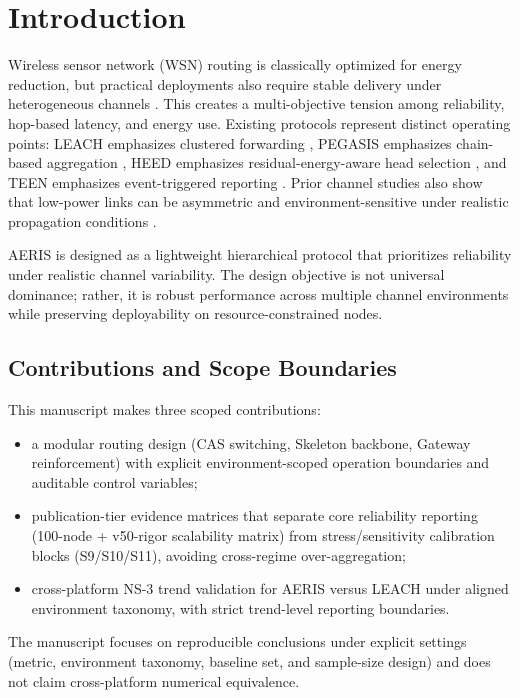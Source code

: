 ﻿\documentclass[sensors,article,submit,moreauthors,pdftex]{Definitions/mdpi}
\begin{document}
\section{Introduction}
Wireless sensor network (WSN) routing is classically optimized for energy reduction, but practical deployments also require stable delivery under heterogeneous channels \cite{Akyildiz2002Survey,Rault2016Energy,Kandris2020}. This creates a multi-objective tension among reliability, hop-based latency, and energy use. Existing protocols represent distinct operating points: LEACH emphasizes clustered forwarding \cite{Heinzelman2000LEACH}, PEGASIS emphasizes chain-based aggregation \cite{Lindsey2002PEGASIS}, HEED emphasizes residual-energy-aware head selection \cite{Younis2004HEED}, and TEEN emphasizes event-triggered reporting \cite{Manjeshwar2001TEEN}. Prior channel studies also show that low-power links can be asymmetric and environment-sensitive under realistic propagation conditions \cite{Zuniga2004,Zuniga2007Asymmetry,Baccour2012RLQE}.

AERIS is designed as a lightweight hierarchical protocol that prioritizes reliability under realistic channel variability. The design objective is not universal dominance; rather, it is robust performance across multiple channel environments while preserving deployability on resource-constrained nodes.

\subsection*{Contributions and Scope Boundaries}
This manuscript makes three scoped contributions:
\begin{itemize}
\item a modular routing design (CAS switching, Skeleton backbone, Gateway reinforcement) with explicit environment-scoped operation boundaries and auditable control variables;
\item publication-tier evidence matrices that separate core reliability reporting (100-node + v50-rigor scalability matrix) from stress/sensitivity calibration blocks (S9/S10/S11), avoiding cross-regime over-aggregation;
\item cross-platform NS-3 trend validation for AERIS versus LEACH under aligned environment taxonomy, with strict trend-level reporting boundaries.
\end{itemize}
The manuscript focuses on reproducible conclusions under explicit settings (metric, environment taxonomy, baseline set, and sample-size design) and does not claim cross-platform numerical equivalence.
\end{document}
